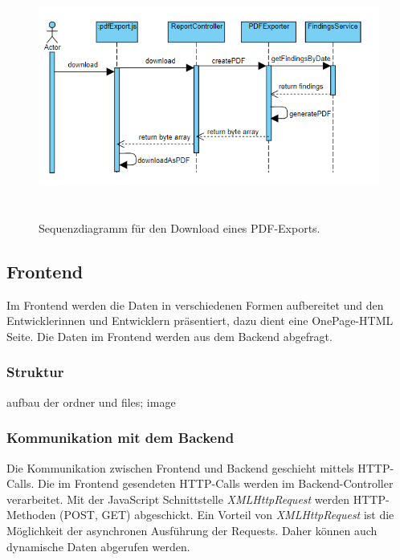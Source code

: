 \begin{figure}[tp]
  \centering
  \includegraphics[height=8cm]{images/seqGeneratePdf.PNG}
 \caption[Sequenzdiagramm für den Download eines PDF-Exports]{Sequenzdiagramm für den Download eines PDF-Exports.}
  \label{fig:engine}
\end{figure}

\subsection{Frontend}
Im Frontend werden die Daten in verschiedenen Formen aufbereitet und den Entwicklerinnen und Entwicklern präsentiert, dazu dient eine OnePage-HTML Seite. Die Daten im Frontend werden aus dem Backend abgefragt.
\subsubsection{Struktur}
aufbau der ordner und files; image
\subsubsection{Kommunikation mit dem Backend}
Die Kommunikation zwischen Frontend und Backend geschieht mittels HTTP-Calls. Die im Frontend gesendeten HTTP-Calls werden im Backend-Controller verarbeitet.  Mit der JavaScript Schnittstelle \textit{XMLHttpRequest} werden HTTP-Methoden (POST, GET) abgeschickt. Ein Vorteil von \textit{XMLHttpRequest} ist die Möglichkeit der asynchronen Ausführung der Requests. Daher können auch dynamische Daten abgerufen werden.  \cite{ajaxOnJava}
\lstset{
  caption={Erstellung eines GET-Request für Projektdaten mit der Schnittstelle XMLHttpRequest.}, 
  basicstyle=\small\ttfamily, 
  label=lst:main, 
  language=Java,
  frame=single,
  breaklines=true, %
  postbreak=\mbox{\textcolor{red}{$\hookrightarrow$}\space},
}

